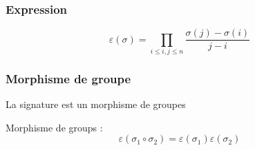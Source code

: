 \subsubsection{Expression} %
\label{sec:Expression}

\begin{equation}
  \varepsilon (\sigma) = \prod_{i \le i,j \le n}^{} \frac{\sigma(j) - \sigma(i)}{j-i} 
\end{equation}

\subsubsection{Morphisme de groupe} %
\begin{Prop}{La signature est un morphisme de groupes}{}
\begin{tcolorbox}
    Morphisme de groups : 
    \begin{equation}
      \varepsilon( \sigma_1 \circ \sigma_2) = \varepsilon(\sigma_1) \varepsilon(\sigma_2)
    \end{equation}
\end{tcolorbox}
\end{Prop}



